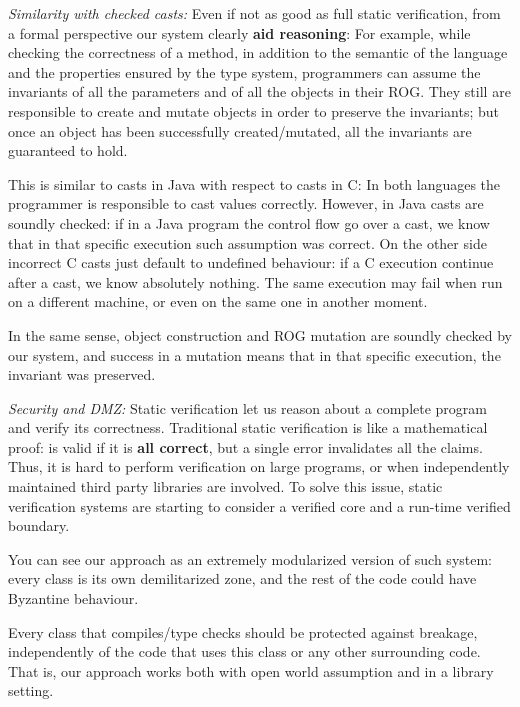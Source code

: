 \noindent\textit{Similarity with checked casts:}
Even if not as good as full static verification, from a formal perspective our system clearly \textbf{aid reasoning}:
For example, while checking the correctness of a method,
in addition to the semantic of the language
and the properties ensured by the type system,
programmers can assume the invariants of all the parameters and of all the
objects in their ROG.
They still are responsible to create and mutate objects in order to preserve the invariants;
but once an object has been successfully created/mutated, all the invariants are guaranteed to hold.

This is similar to casts in Java with respect to casts in C:
In both languages the programmer is responsible to cast values correctly.
However, in Java casts are soundly checked: if in a Java program the control flow go over a cast,
 we know that in that specific
execution such assumption was correct.
On the other side incorrect C casts just default to undefined behaviour:
if a C execution continue after a cast, we know absolutely nothing. The same execution
 may fail when run on a different machine, 
or even on the same one in another moment.

In the same sense, object construction and ROG mutation are soundly checked by our system,
and success in a mutation means that in that specific execution, the invariant was preserved.



\noindent\textit{Security and DMZ:}
Static verification let us reason about a complete program
and verify its correctness.
Traditional static verification is like a mathematical proof: is valid if it is \textbf{all correct},
but a single error invalidates all the claims.
Thus, it is hard to perform verification on large programs, or when independently maintained third party libraries
are involved.
To solve this issue, static verification systems are starting to consider a verified core
and a run-time verified boundary.

You can see our approach as an extremely modularized version of such system:
every class is its own demilitarized zone, and the rest of the code 
could have Byzantine behaviour.

Every class that compiles/type checks should be protected against breakage,
 independently of the code that uses this class or any other surrounding code.
 That is, our approach works both with open world assumption and in a library setting.

